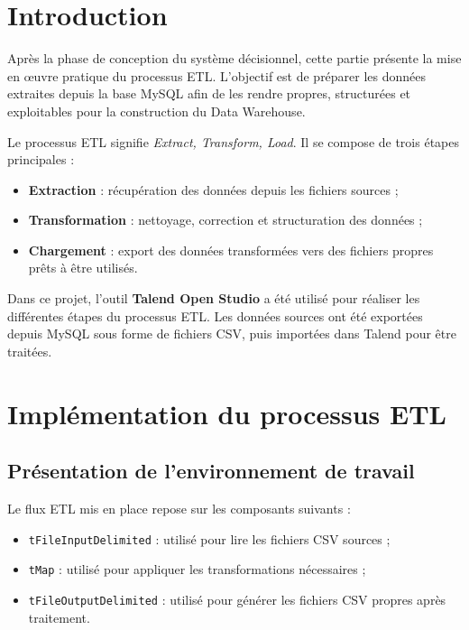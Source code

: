 \documentclass[12pt,a4paper]{report}
\begin{document}
\section{Introduction}

Après la phase de conception du système décisionnel, cette partie présente la mise en œuvre pratique du processus ETL. L’objectif est de préparer les données extraites depuis la base MySQL afin de les rendre propres, structurées et exploitables pour la construction du Data Warehouse.

Le processus ETL signifie \textit{Extract, Transform, Load}. Il se compose de trois étapes principales :
\begin{itemize}
	\item \textbf{Extraction} : récupération des données depuis les fichiers sources ;
	\item \textbf{Transformation} : nettoyage, correction et structuration des données ;
	\item \textbf{Chargement} : export des données transformées vers des fichiers propres prêts à être utilisés.
\end{itemize}

Dans ce projet, l’outil \textbf{Talend Open Studio} a été utilisé pour réaliser les différentes étapes du processus ETL. Les données sources ont été exportées depuis MySQL sous forme de fichiers CSV, puis importées dans Talend pour être traitées.

\section{Implémentation du processus ETL}

\subsection{Présentation de l’environnement de travail}

Le flux ETL mis en place repose sur les composants suivants :

\begin{itemize}
	\item \texttt{tFileInputDelimited} : utilisé pour lire les fichiers CSV sources ;
	\item \texttt{tMap} : utilisé pour appliquer les transformations nécessaires ;
	\item \texttt{tFileOutputDelimited} : utilisé pour générer les fichiers CSV propres après traitement.
\end{itemize}
\end{document}
